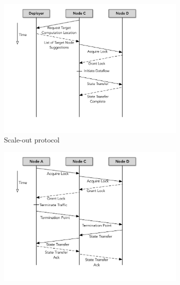 \begin{figure}[h!]
        \begin{subfigure}{0.45\textwidth}
                \centering
                \includegraphics[scale=0.4, valign=t]{figures/scale-out.pdf}
                \caption{Scale-out protocol}
                \label{fig:scale-out-protocol}    
        \end{subfigure}
        \begin{subfigure}{0.45\textwidth}
                \centering
                \includegraphics[scale=0.4, valign=t]{figures/scale-in.pdf} 

\end{subfigure}
\end{figure}
